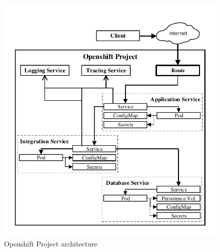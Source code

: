\begin{figure}[htbp]
	\centering
	\includegraphics[scale=1]{images/esboc-design-openshift.pdf}
	\caption{Openshift Project architecture}
	\label{fig:esboc-design-openshift-project}
\end{figure} 

